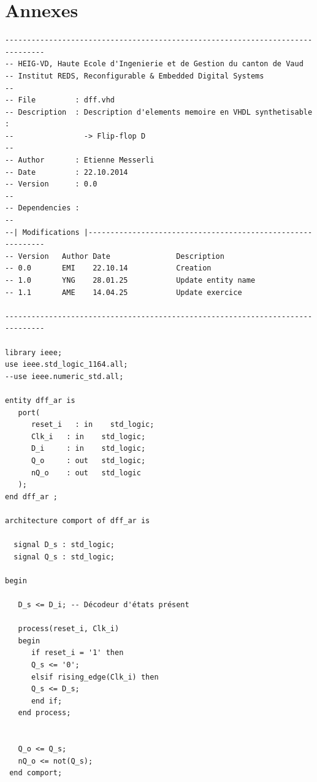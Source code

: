\section{Annexes}
\begin{verbatim}
-------------------------------------------------------------------------------
-- HEIG-VD, Haute Ecole d'Ingenierie et de Gestion du canton de Vaud
-- Institut REDS, Reconfigurable & Embedded Digital Systems
--
-- File         : dff.vhd
-- Description  : Description d'elements memoire en VHDL synthetisable :
--                -> Flip-flop D
--
-- Author       : Etienne Messerli
-- Date         : 22.10.2014
-- Version      : 0.0
--
-- Dependencies : 
--
--| Modifications |------------------------------------------------------------
-- Version   Author Date               Description
-- 0.0       EMI    22.10.14           Creation
-- 1.0       YNG    28.01.25           Update entity name
-- 1.1       AME    14.04.25           Update exercice

-------------------------------------------------------------------------------

library ieee;
use ieee.std_logic_1164.all;
--use ieee.numeric_std.all;

entity dff_ar is
   port( 
      reset_i   : in    std_logic;
      Clk_i   : in    std_logic;
      D_i     : in    std_logic;
      Q_o     : out   std_logic;
      nQ_o    : out   std_logic
   );
end dff_ar ;

architecture comport of dff_ar is

  signal D_s : std_logic; 
  signal Q_s : std_logic; 

begin
  
   D_s <= D_i; -- Décodeur d'états présent
  
   process(reset_i, Clk_i)
   begin
      if reset_i = '1' then
      Q_s <= '0';
      elsif rising_edge(Clk_i) then
      Q_s <= D_s;
      end if;
   end process;
 
 
   Q_o <= Q_s;
   nQ_o <= not(Q_s);
 end comport;
\end{verbatim}
\newpage

